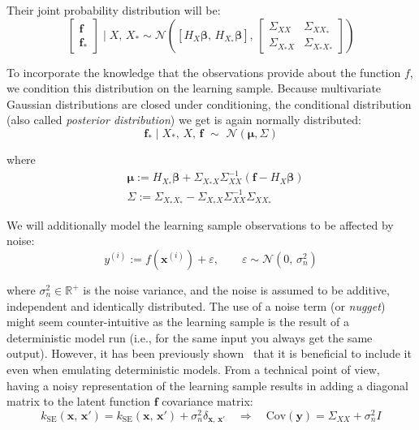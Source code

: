 \noindent
Their joint probability distribution will be:
%
\begin{equation}
    \begin{bmatrix}
    \mathbf{f} \\ \mathbf{f}_{*}
    \end{bmatrix}\;\vert\; X,\,X_{*} \sim \mathcal{N}\left([H_{X}\boldsymbol{\beta},\,H_{X_{*}}\boldsymbol{\beta}],\,\begin{bmatrix}
    \Sigma_{XX} & \Sigma_{XX_{*}} \\
    \Sigma_{X_{*}X} & \Sigma_{X_{*}X_{*}}
    \end{bmatrix}
    \right)
\end{equation}

\noindent
To incorporate the knowledge that the observations provide about the function $f$, we condition this distribution on the learning sample. Because multivariate Gaussian distributions are closed under conditioning, the conditional distribution (also called \textit{posterior distribution}) we get is again normally distributed:
%
\begin{equation}\label{eq:gpepostdistrnonoise}
    \mathbf{f}_{*}\;\vert\; X_{*},\,X,\,\mathbf{f}\,\,\sim\,\,\mathcal{N}(\boldsymbol{\mu},\Sigma)
\end{equation}
    
\noindent
where
%
\begin{align}
    &\boldsymbol{\mu} := H_{X_{*}}\boldsymbol{\beta} + \Sigma_{X_{*}X}\Sigma_{XX}^{-1}(\mathbf{f} - H_{X}\boldsymbol{\beta}) \\
    &\Sigma := \Sigma_{X_{*}X_{*}}-\Sigma_{X_{*}X}\Sigma_{XX}^{-1}\Sigma_{XX_{*}}
\end{align}

We will additionally model the learning sample observations to be affected by noise:
%
\begin{equation}
    y^{(i)}:=f(\mathbf{x}^{(i)}) + \varepsilon,\qquad \varepsilon\sim\mathcal{N}(0,\,\sigma_n^2)
\end{equation}

\noindent
where $\sigma_n^2\in\mathbb{R}^{+}$ is the noise variance, and the noise is assumed to be additive, independent and identically distributed. The use of a noise term (or \textit{nugget}) might seem counter-intuitive as the learning sample is the result of a deterministic model run (i.e., for the same input you always get the same output). However, it has been previously shown~\cite{Andrianakis:2012} that it is beneficial to include it even when emulating deterministic models. From a technical point of view, having a noisy representation of the learning sample results in adding a diagonal matrix to the latent function $\mathbf{f}$ covariance matrix:
%
\begin{equation}
    k_{\text{SE}}(\mathbf{x},\,\mathbf{x}') = k_{\text{SE}}(\mathbf{x},\,\mathbf{x}') + \sigma_n^2\delta_{\mathbf{x},\,\mathbf{x}'} \quad\Rightarrow\quad \text{Cov}(\mathbf{y})=\Sigma_{XX}+\sigma_n^2 I
\end{equation}

